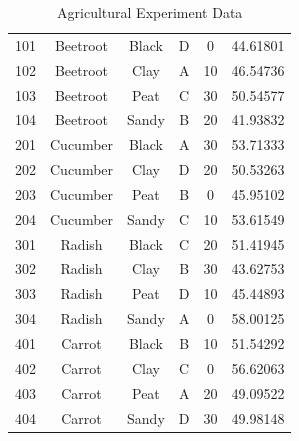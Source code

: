 \documentclass{article}
\begin{document}
\begin{table}[h]
\begin{tabular}{|c|c|c|c|c|c|}
101 & Beetroot & Black & D & 0 & 44.61801 \\
102 & Beetroot & Clay & A & 10 & 46.54736 \\
103 & Beetroot & Peat & C & 30 & 50.54577 \\
104 & Beetroot & Sandy & B & 20 & 41.93832 \\
201 & Cucumber & Black & A & 30 & 53.71333 \\
202 & Cucumber & Clay & D & 20 & 50.53263 \\
203 & Cucumber & Peat & B & 0 & 45.95102 \\
204 & Cucumber & Sandy & C & 10 & 53.61549 \\
301 & Radish & Black & C & 20 & 51.41945 \\
302 & Radish & Clay & B & 30 & 43.62753 \\
303 & Radish & Peat & D & 10 & 45.44893 \\
304 & Radish & Sandy & A & 0 & 58.00125 \\
401 & Carrot & Black & B & 10 & 51.54292 \\
402 & Carrot & Clay & C & 0 & 56.62063 \\
403 & Carrot & Peat & A & 20 & 49.09522 \\
404 & Carrot & Sandy & D & 30 & 49.98148 \\
\hline
\end{tabular}
\caption{Agricultural Experiment Data}
\label{tab:agri-experiment}
\end{table}
\end{document}
